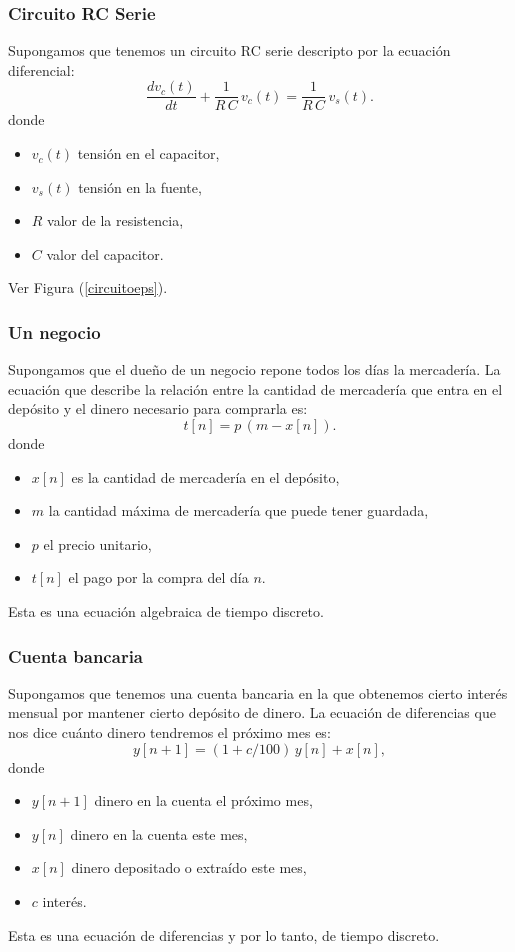 \subsubsection{Circuito RC Serie}
Supongamos que tenemos un circuito RC serie descripto por la ecuación diferencial:
\begin{equation}
	\frac{dv_{c}(t)}{dt} + \frac{1}{R \, C} \, v_{c}(t) = \frac{1}{R \, C} \, v_{s}(t). \label{rcserie}
\end{equation}
donde
\begin{itemize}
	\item $v_{c}(t)$ tensión en el capacitor,
	\item $v_{s}(t)$ tensión en la fuente,
	\item $R$ valor de la resistencia,
	\item $C$ valor del capacitor.
\end{itemize}
Ver Figura (\ref{circuitoeps}).

\subsubsection{Un negocio}
Supongamos que el dueño de un negocio repone todos los días la mercadería. La ecuación que describe la relación entre la cantidad de mercadería que entra en el depósito y el dinero necesario para comprarla es:
\begin{equation}
	t[n] = p \, (m - x[n]).
\end{equation}
donde
\begin{itemize}
	\item $x[n]$ es la cantidad de mercadería en el depósito,
	\item $m$ la cantidad máxima de mercadería que puede tener guardada,
	\item $p$ el precio unitario,
	\item $t[n]$ el pago por la compra del día $n$.
\end{itemize}
Esta es una ecuación algebraica de tiempo discreto.

\subsubsection{Cuenta bancaria}
Supongamos que tenemos una cuenta bancaria en la que obtenemos cierto interés mensual por mantener cierto depósito de dinero. La ecuación de diferencias que nos dice cuánto dinero tendremos el próximo mes es:
\begin{equation}
	y[n+1] = (1 + c/100) \, y[n] + x[n],
\end{equation}
donde
\begin{itemize}
	\item $y[n+1]$ dinero en la cuenta el próximo mes,
	\item $y[n]$ dinero en la cuenta este mes,
	\item $x[n]$ dinero depositado o extraído este mes,
	\item $c$ interés.
\end{itemize}
Esta es una ecuación de diferencias y por lo tanto, de tiempo discreto.

